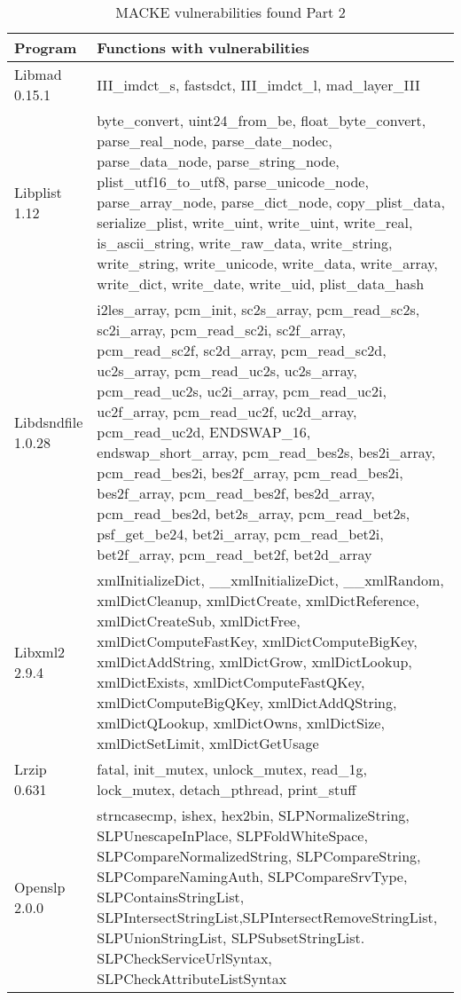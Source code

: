 \begin{table}[H]
	\centering
	\caption{MACKE vulnerabilities found Part 2}
	\begin{tabular}{ |p{4cm}||p{10cm}|  }
		\hline
		Program & Functions with vulnerabilities\\
		\hline
		Libmad 0.15.1    & III\_imdct\_s, fastsdct, III\_imdct\_l, mad\_layer\_III \\
		Libplist 1.12    & byte\_convert, uint24\_from\_be, float\_byte\_convert, parse\_real\_node, parse\_date\_nodec, parse\_data\_node, parse\_string\_node, plist\_utf16\_to\_utf8, parse\_unicode\_node, parse\_array\_node, parse\_dict\_node, copy\_plist\_data, serialize\_plist, write\_uint, write\_uint, write\_real, is\_ascii\_string, write\_raw\_data, write\_string, write\_string, write\_unicode, write\_data, write\_array, write\_dict, write\_date, write\_uid, plist\_data\_hash\\
		Libdsndfile 1.0.28    & i2les\_array, pcm\_init, sc2s\_array, pcm\_read\_sc2s, sc2i\_array, pcm\_read\_sc2i, sc2f\_array, pcm\_read\_sc2f, sc2d\_array, pcm\_read\_sc2d, uc2s\_array, pcm\_read\_uc2s, uc2s\_array, pcm\_read\_uc2s, uc2i\_array, pcm\_read\_uc2i, uc2f\_array, pcm\_read\_uc2f, uc2d\_array, pcm\_read\_uc2d, ENDSWAP\_16, endswap\_short\_array, pcm\_read\_bes2s, bes2i\_array, pcm\_read\_bes2i, bes2f\_array, pcm\_read\_bes2i, bes2f\_array, pcm\_read\_bes2f, bes2d\_array, pcm\_read\_bes2d, bet2s\_array, pcm\_read\_bet2s, psf\_get\_be24, bet2i\_array, pcm\_read\_bet2i, bet2f\_array, pcm\_read\_bet2f, bet2d\_array\\
		Libxml2 2.9.4    & xmlInitializeDict, \_\_xmlInitializeDict, \_\_xmlRandom, xmlDictCleanup, xmlDictCreate, xmlDictReference, xmlDictCreateSub, xmlDictFree, xmlDictComputeFastKey, xmlDictComputeBigKey, xmlDictAddString, xmlDictGrow, xmlDictLookup, xmlDictExists, xmlDictComputeFastQKey, xmlDictComputeBigQKey, xmlDictAddQString, xmlDictQLookup, xmlDictOwns, xmlDictSize, xmlDictSetLimit, xmlDictGetUsage\\
		Lrzip 0.631    & fatal, init\_mutex, unlock\_mutex, read\_1g,  lock\_mutex, detach\_pthread, print\_stuff \\
		Openslp 2.0.0    & strncasecmp, ishex, hex2bin, SLPNormalizeString, SLPUnescapeInPlace, SLPFoldWhiteSpace, SLPCompareNormalizedString, SLPCompareString, SLPCompareNamingAuth, SLPCompareSrvType, SLPContainsStringList, SLPIntersectStringList,SLPIntersectRemoveStringList, SLPUnionStringList, SLPSubsetStringList. SLPCheckServiceUrlSyntax, SLPCheckAttributeListSyntax \\
		\hline
	\end{tabular}
\end{table}


